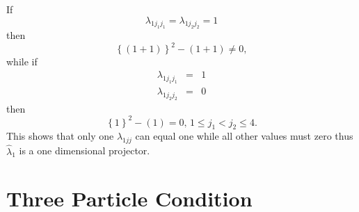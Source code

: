 \documentclass[12pt]{article}
\begin{document}
If 
\begin{equation*}
\lambda _{1j_{1}j_{1}}=\lambda _{1j_{2}j_{2}}=1 
\end{equation*}%
then 
\begin{equation*}
\left\{ \left( 1+1\right) \right\} ^{2}-\left( 1+1\right) \neq 0, 
\end{equation*}%
while if 
\begin{eqnarray*}
\lambda _{1j_{1}j_{1}} &=&1 \\
\lambda _{1j_{2}j_{2}} &=&0
\end{eqnarray*}%
then 
\begin{equation*}
\left\{ 1\right\} ^{2}-\left( 1\right) =0,\,1\leq j_{1}<j_{2}\leq 4. 
\end{equation*}%
This shows that only one $\lambda _{1jj}$ can equal one while all other
values must zero thus $\hat{\lambda}_{1}$ is a one dimensional projector.

\section{Three Particle Condition}
\end{document}

